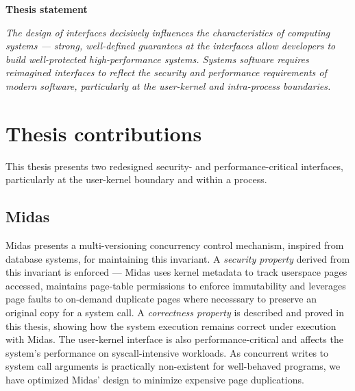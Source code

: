 \begin{center}
      \textbf{Thesis statement}

\emph{
The design of interfaces decisively influences the characteristics of 
computing systems --- 
strong, well-defined guarantees at the interfaces allow developers to build 
well-protected high-performance systems.
Systems software requires reimagined interfaces to reflect the security
and performance requirements of modern software, particularly at the 
user-kernel and intra-process boundaries.
}
\end{center}

\section{Thesis contributions}

This thesis presents two redesigned security- and performance-critical 
interfaces, particularly at the user-kernel boundary and within a process.

\subsection{Midas}
Midas presents a multi-versioning concurrency control mechanism, inspired
from database systems, for maintaining this invariant. 
A \emph{security property} derived from this invariant is enforced ---
Midas uses kernel metadata to track userspace pages accessed, maintains
page-table permissions to enforce immutability and leverages page faults
to on-demand duplicate pages where necesssary to preserve an original
copy for a system call.
A \emph{correctness property} is described and proved in this thesis,
showing how the system execution remains correct under execution with
Midas.
The user-kernel interface is also performance-critical and affects the
system's performance on syscall-intensive workloads.
As concurrent writes to system call arguments is practically non-existent
for well-behaved programs, we have optimized Midas' design to minimize 
expensive page duplications.

